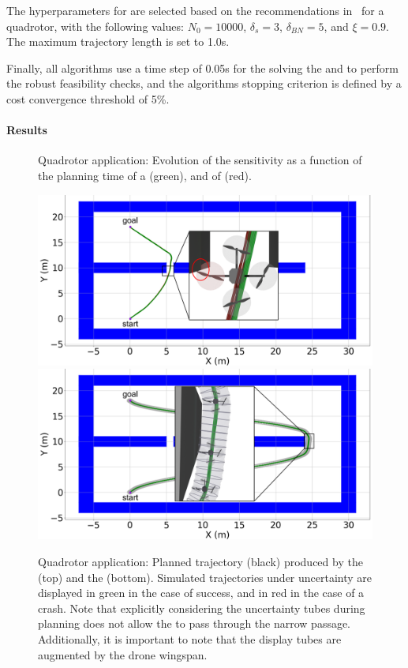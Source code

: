 The hyperparameters for  are selected based on the recommendations in~\cite{cSST} for a quadrotor, with the following values: $N_0 = 10000$, $\delta_s = 3$, $\delta_{BN} = 5$, and $\xi = 0.9$.
The maximum trajectory length is set to 1.0s.

Finally, all algorithms use a time step of 0.05s for the solving the  and to perform the robust feasibility checks, and the algorithms stopping criterion is defined by a cost convergence threshold of 5\%.

\paragraph{Results}



\begin{figure} [h!]
    \centering
     
    \caption{Quadrotor application: Evolution of the sensitivity as a function of the planning time of a  (green), and of  (red).}%
    \label{fig:samp_quad_time}%
\end{figure}

\begin{figure} [h!]
    \centering
    \includegraphics[width=0.8\linewidth]{figures/samp/non_robust_quad.png}
    \includegraphics[width=0.8\linewidth]{figures/samp/robust_quad.png}
    \caption{Quadrotor application: Planned trajectory (black) produced by the  (top) and the  (bottom). 
    Simulated trajectories under uncertainty are displayed in green in the case of success, and in red in the case of a crash.
    Note that explicitly considering the uncertainty tubes during planning does not allow the  to pass through the narrow passage.
    Additionally, it is important to note that the display tubes are augmented by the drone wingspan.}%
    \label{fig:robust_quad}%
\end{figure}

